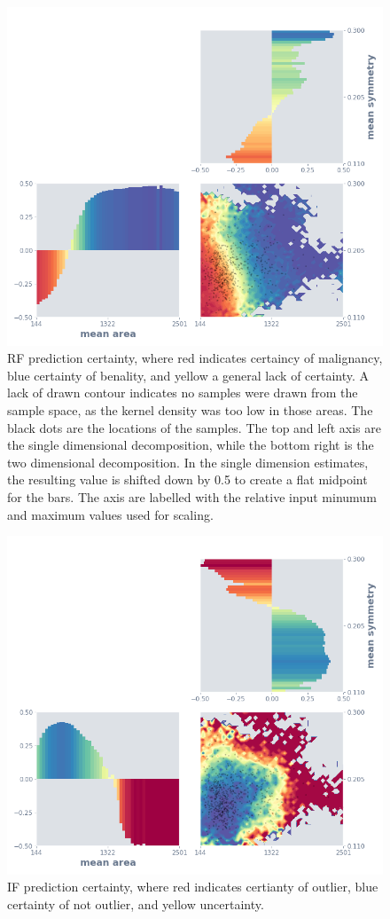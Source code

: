 \documentclass[a4paper, twocolumn]{article}
\begin{document}
\begin{figure}
\centering
\includegraphics[width=0.8\columnwidth]{img/interp_rf.png}
\caption{RF prediction certainty, where red indicates certaincy of malignancy, blue certainty of benality, and yellow a general lack of certainty. A lack of drawn contour indicates no samples were drawn from the sample space, as the kernel density was too low in those areas. The black dots are the locations of the samples. The top and left axis are the single dimensional decomposition, while the bottom right is the two dimensional decomposition. In the single dimension estimates, the resulting value is shifted down by 0.5 to create a flat midpoint for the bars. The axis are labelled with the relative input minumum and maximum values used for scaling.}
\label{fig:interp-rf}
\end{figure}

\begin{figure}
\centering
\includegraphics[width=0.8\columnwidth]{img/interp_if.png}
\caption{IF prediction certainty, where red indicates certianty of outlier, blue certainty of not outlier, and yellow uncertainty.}
\label{fig:interp-if}
\end{figure}
\end{document}

